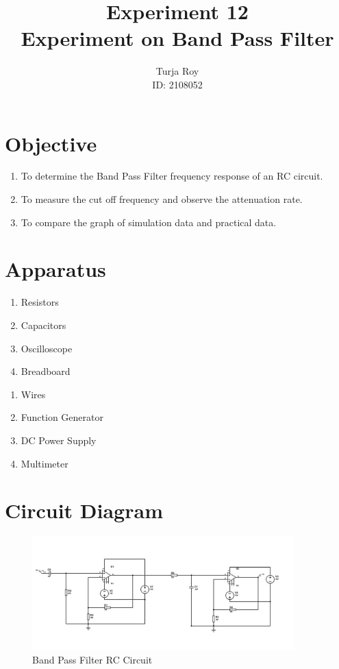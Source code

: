 \documentclass[12pt]{article}
\title{
    \textbf{Experiment 12} \\
    \textbf{Experiment on Band Pass Filter} \\
}
\author{
    Turja Roy \\
    ID: 2108052
}
\date{}
\begin{document}
\maketitle

\section{Objective}
\begin{enumerate}
    \item To determine the Band Pass Filter frequency response of an RC circuit. 
    \item To measure the cut off frequency and observe the attenuation rate. 
    \item To compare the graph of simulation data and practical data.
\end{enumerate}

\section{Apparatus}
\begin{multicols}{2}
    \begin{enumerate}
        \item Resistors
        \item Capacitors
        \item Oscilloscope
        \item Breadboard
    \end{enumerate}
    \columnbreak
    \begin{enumerate}
        \item Wires
        \item Function Generator
        \item DC Power Supply
        \item Multimeter
    \end{enumerate}
\end{multicols}

\section{Circuit Diagram}
\begin{figure}[h]
    \centering
    \includegraphics[width=0.9\textwidth]{BPF.png}
    \caption{Band Pass Filter RC Circuit}
\end{figure}
\end{document}
